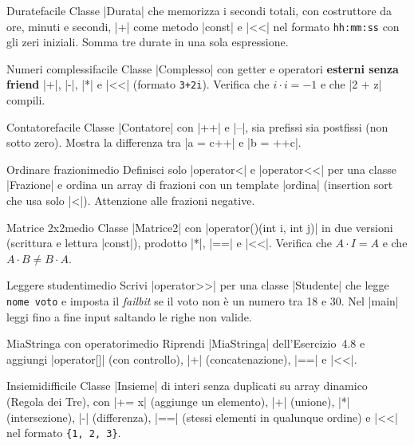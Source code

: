 \begin{esercizio}{Durate}{facile}
Classe \cc|Durata| che memorizza i secondi totali, con costruttore da ore, minuti e
secondi, \cc|+| come metodo \cc|const| e \cc|<<| nel formato \texttt{hh:mm:ss} con gli
zeri iniziali. Somma tre durate in una sola espressione.
\end{esercizio}

\begin{esercizio}{Numeri complessi}{facile}
Classe \cc|Complesso| con getter e operatori \textbf{esterni senza friend} \cc|+|,
\cc|-|, \cc|*| e \cc|<<| (formato \texttt{3+2i}). Verifica che $i \cdot i = -1$ e che
\cc|2 + z| compili.
\end{esercizio}

\begin{esercizio}{Contatore}{facile}
Classe \cc|Contatore| con \cc|++| e \cc|--|, sia prefissi sia postfissi (non sotto
zero). Mostra la differenza tra \cc|a = c++| e \cc|b = ++c|.
\end{esercizio}

\begin{esercizio}{Ordinare frazioni}{medio}
Definisci solo \cc|operator<| e \cc|operator<<| per una classe \cc|Frazione| e ordina un
array di frazioni con un template \cc|ordina| (insertion sort che usa solo \cc|<|).
Attenzione alle frazioni negative.
\end{esercizio}

\begin{esercizio}{Matrice 2x2}{medio}
Classe \cc|Matrice2| con \cc|operator()(int i, int j)| in due versioni (scrittura e
lettura \cc|const|), prodotto \cc|*|, \cc|==| e \cc|<<|. Verifica che $A \cdot I = A$ e
che $A \cdot B \neq B \cdot A$.
\end{esercizio}

\begin{esercizio}{Leggere studenti}{medio}
Scrivi \cc|operator>>| per una classe \cc|Studente| che legge \texttt{nome voto} e
imposta il \emph{failbit} se il voto non è un numero tra 18 e 30. Nel \cc|main| leggi
fino a fine input saltando le righe non valide.
\end{esercizio}

\begin{esercizio}{MiaStringa con operatori}{medio}
Riprendi \cc|MiaStringa| dell'Esercizio~4.8 e aggiungi \cc|operator[]| (con controllo),
\cc|+| (concatenazione), \cc|==| e \cc|<<|.
\end{esercizio}

\begin{esercizio}{Insiemi}{difficile}
Classe \cc|Insieme| di interi senza duplicati su array dinamico (Regola dei Tre), con
\cc|+= x| (aggiunge un elemento), \cc|+| (unione), \cc|*| (intersezione), \cc|-|
(differenza), \cc|==| (stessi elementi in qualunque ordine) e \cc|<<| nel formato
\texttt{\{1, 2, 3\}}.
\end{esercizio}

